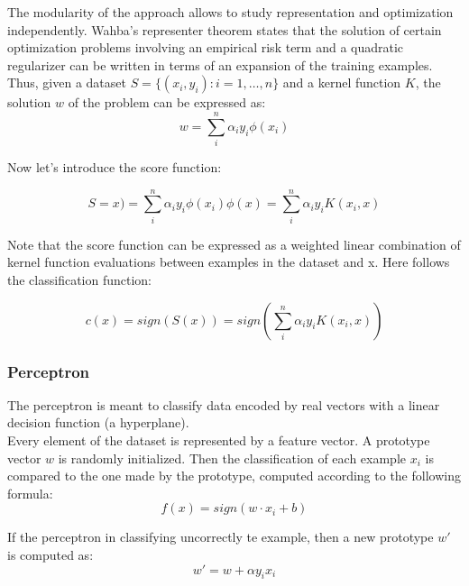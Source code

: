 The modularity of the approach allows to study representation and optimization
independently. Wahba's representer theorem states that the solution of certain
optimization problems involving an empirical risk term and a quadratic
regularizer can be written in terms of an expansion of the training examples.
Thus, given a dataset $S = \{(x_i, y_i): i = 1, \dots, n\}$ and a kernel
function $K$, the solution $w$ of the problem can be expressed as:
\begin{equation}
	w = \sum_i^n \alpha_i y_i \phi(x_i)
\end{equation}

Now let's introduce the score function:

\begin{equation}
	S=x) = \sum_i^n \alpha_i y_i \phi(x_i) \phi(x) = \sum_i^n \alpha_i y_i
	K(x_i, x)
\end{equation}

Note that the score function can be expressed as a weighted linear combination
of kernel function evaluations between examples in the dataset and x. Here
follows the classification function:

\begin{equation}
	c(x) = sign(S(x)) = sign \left( \sum_i^n \alpha_i y_i K(x_i, x) \right)
\end{equation}

\subsubsection{Perceptron}

The perceptron is meant to classify data encoded by real vectors with a linear
decision function (a hyperplane).\\
Every element of the dataset is represented by a feature vector. A prototype
vector $w$ is randomly initialized. Then the classification of each example
$x_i$ is compared to the one made by the prototype, computed according to the
following formula:
\begin{equation}
	f(x) = sign(w \cdot x_i + b)
\end{equation}

If the perceptron in classifying uncorrectly te example, then a new prototype
$w'$ is computed as:
\begin{equation}
	w' = w + \alpha y_i x_i
\end{equation}

